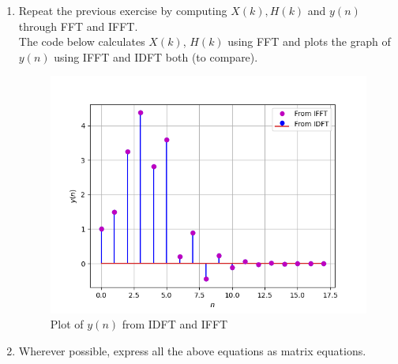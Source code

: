 \documentclass[journal,12pt,twocolumn]{IEEEtran}
\theoremstyle{remark}
\renewcommand\thesection{\arabic{section}}
\numberwithin{equation}{subsection}
\begin{document}
\begin{enumerate}[label=\thesection.\arabic*]
\item Repeat the previous exercise by computing $X(k), H(k)$ and $y(n)$ through FFT and 
IFFT.\\

\solution The code below calculates $X(k)$, $H(k)$ using FFT and plots the graph of $y(n)$ using IFFT and IDFT both (to compare).
\begin{figure}[!h]
    \centering
    \includegraphics[width = \columnwidth]{figs/6.4.png}
    \caption{Plot of $y(n)$ from IDFT and IFFT}
    \label{fig:enter-label}
\end{figure}

\newpage
\item Wherever possible, express all the above equations as matrix equations.
\\


\end{enumerate}
\end{document}
